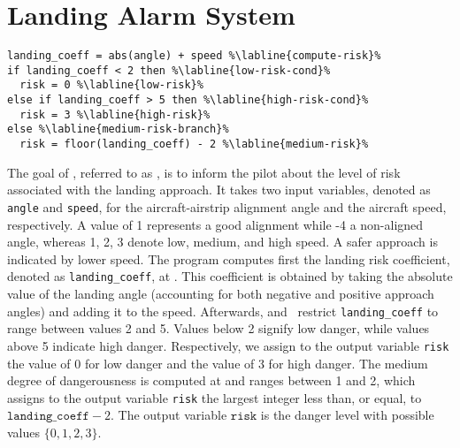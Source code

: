 %

\section{Landing Alarm System}
\newcommand*{\x}{\texttt{angle}}
\newcommand*{\y}{\texttt{speed}}
\newcommand*{\z}{\texttt{risk}}
\newcommand*{\lc}{\texttt{landing\_coeff}}


\begin{marginlisting}
  \caption{Program for the landing-risk alarm system.}
  \vspace{0.5cm}
\begin{lstlisting}[language=customPython,escapechar=\%]
landing_coeff = abs(angle) + speed %\labline{compute-risk}%
if landing_coeff < 2 then %\labline{low-risk-cond}%
  risk = 0 %\labline{low-risk}%
else if landing_coeff > 5 then %\labline{high-risk-cond}%
  risk = 3 %\labline{high-risk}%
else %\labline{medium-risk-branch}%
  risk = floor(landing_coeff) - 2 %\labline{medium-risk}%
\end{lstlisting}
\end{marginlisting}


The goal of , referred to as \landingprogram, is to inform the pilot about the level of risk associated with the landing approach.
It takes two input variables, denoted as \x{} and \y, for the aircraft-airstrip alignment angle and the aircraft speed, respectively.
A value of 1 represents a good alignment while -4 a non-aligned angle, whereas 1, 2, 3 denote low, medium, and high speed.
A safer approach is indicated by lower speed.
The program \landingprogram{} computes first the landing risk coefficient, denoted as \lc, at .
This coefficient is obtained by taking the absolute value of the landing angle (accounting for both negative and positive approach angles) and adding it to the speed.
Afterwards,  and~ restrict \lc{} to range between values 2 and 5.
Values below 2 signify low danger, while values above 5 indicate high danger.
Respectively, we assign to the output variable \z{} the value of 0 for low danger and the value of 3 for high danger.
The medium degree of dangerousness is computed at  and ranges between 1 and 2, which assigns to the output variable \z{} the largest integer less than, or equal, to $\lc-2$.
The output variable $\z{}$ is the danger level with possible values $\{0, 1, 2, 3\}$.

